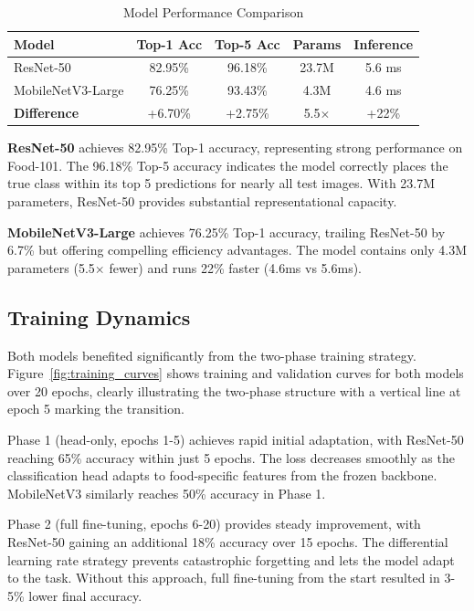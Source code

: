 \documentclass[conference]{IEEEtran}
\begin{document}
\begin{table}[htbp]
\caption{Model Performance Comparison}
\begin{center}
\begin{tabular}{lcccc}
\toprule
\textbf{Model} & \textbf{Top-1 Acc} & \textbf{Top-5 Acc} & \textbf{Params} & \textbf{Inference} \\
\midrule
ResNet-50 & 82.95\% & 96.18\% & 23.7M & 5.6 ms \\
MobileNetV3-Large & 76.25\% & 93.43\% & 4.3M & 4.6 ms \\
\midrule
\textbf{Difference} & +6.70\% & +2.75\% & 5.5$\times$ & +22\% \\
\bottomrule
\end{tabular}
\label{tab:performance}
\end{center}
\end{table}

\textbf{ResNet-50} achieves 82.95\% Top-1 accuracy, representing strong performance on Food-101. The 96.18\% Top-5 accuracy indicates the model correctly places the true class within its top 5 predictions for nearly all test images. With 23.7M parameters, ResNet-50 provides substantial representational capacity.

\textbf{MobileNetV3-Large} achieves 76.25\% Top-1 accuracy, trailing ResNet-50 by 6.7\% but offering compelling efficiency advantages. The model contains only 4.3M parameters (5.5$\times$ fewer) and runs 22\% faster (4.6ms vs 5.6ms).

\subsection{Training Dynamics}
Both models benefited significantly from the two-phase training strategy. Figure~\ref{fig:training_curves} shows training and validation curves for both models over 20 epochs, clearly illustrating the two-phase structure with a vertical line at epoch 5 marking the transition.

Phase 1 (head-only, epochs 1-5) achieves rapid initial adaptation, with ResNet-50 reaching 65\% accuracy within just 5 epochs. The loss decreases smoothly as the classification head adapts to food-specific features from the frozen backbone. MobileNetV3 similarly reaches 50\% accuracy in Phase 1.

Phase 2 (full fine-tuning, epochs 6-20) provides steady improvement, with ResNet-50 gaining an additional 18\% accuracy over 15 epochs. The differential learning rate strategy prevents catastrophic forgetting and lets the model adapt to the task. Without this approach, full fine-tuning from the start resulted in 3-5\% lower final accuracy.
\end{document}
